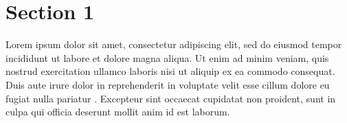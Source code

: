 \documentclass[12pt]{article}
\begin{document}

\pagebreak
\section{Section 1}
	
	\begin{paragraph}
		Lorem ipsum dolor sit amet, consectetur adipiscing elit\cite{ARTICLE:1}, sed do eiusmod tempor incididunt ut\cite{BOOK:1} \cite{BOOK:2} labore et dolore magna aliqua. Ut enim ad minim veniam, quis nostrud exercitation ullamco laboris nisi ut aliquip ex ea commodo consequat. Duis aute irure dolor in reprehenderit in voluptate velit esse cillum dolore eu fugiat nulla pariatur \cite{WEBSITE:1}. Excepteur sint occaecat cupidatat non proident, sunt in culpa qui officia deserunt mollit anim id est laborum.
		\\[3cm]
	\end{paragraph}



	\printbibliography
\end{document}
